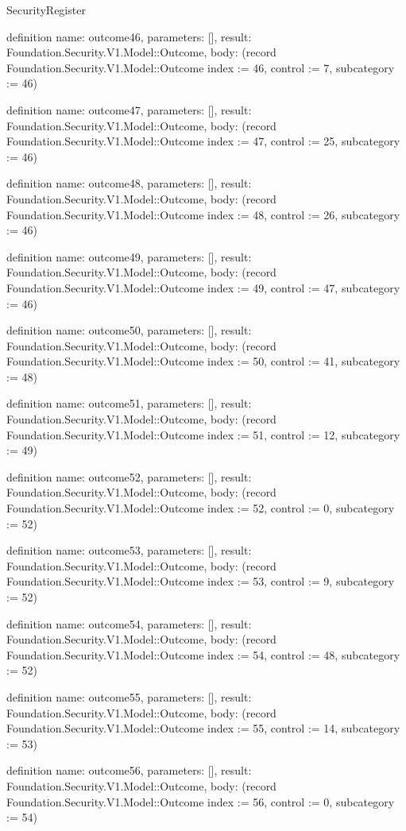 \begin{lexlean}{SecurityRegister}
\begin{semanticmodule}
definition{
  name: outcome46,
  parameters: [],
  result: Foundation.Security.V1.Model::Outcome,
  body: (record Foundation.Security.V1.Model::Outcome {index := 46, control := 7, subcategory := 46})
}

definition{
  name: outcome47,
  parameters: [],
  result: Foundation.Security.V1.Model::Outcome,
  body: (record Foundation.Security.V1.Model::Outcome {index := 47, control := 25, subcategory := 46})
}

definition{
  name: outcome48,
  parameters: [],
  result: Foundation.Security.V1.Model::Outcome,
  body: (record Foundation.Security.V1.Model::Outcome {index := 48, control := 26, subcategory := 46})
}

definition{
  name: outcome49,
  parameters: [],
  result: Foundation.Security.V1.Model::Outcome,
  body: (record Foundation.Security.V1.Model::Outcome {index := 49, control := 47, subcategory := 46})
}

definition{
  name: outcome50,
  parameters: [],
  result: Foundation.Security.V1.Model::Outcome,
  body: (record Foundation.Security.V1.Model::Outcome {index := 50, control := 41, subcategory := 48})
}

definition{
  name: outcome51,
  parameters: [],
  result: Foundation.Security.V1.Model::Outcome,
  body: (record Foundation.Security.V1.Model::Outcome {index := 51, control := 12, subcategory := 49})
}

definition{
  name: outcome52,
  parameters: [],
  result: Foundation.Security.V1.Model::Outcome,
  body: (record Foundation.Security.V1.Model::Outcome {index := 52, control := 0, subcategory := 52})
}

definition{
  name: outcome53,
  parameters: [],
  result: Foundation.Security.V1.Model::Outcome,
  body: (record Foundation.Security.V1.Model::Outcome {index := 53, control := 9, subcategory := 52})
}

definition{
  name: outcome54,
  parameters: [],
  result: Foundation.Security.V1.Model::Outcome,
  body: (record Foundation.Security.V1.Model::Outcome {index := 54, control := 48, subcategory := 52})
}

definition{
  name: outcome55,
  parameters: [],
  result: Foundation.Security.V1.Model::Outcome,
  body: (record Foundation.Security.V1.Model::Outcome {index := 55, control := 14, subcategory := 53})
}

definition{
  name: outcome56,
  parameters: [],
  result: Foundation.Security.V1.Model::Outcome,
  body: (record Foundation.Security.V1.Model::Outcome {index := 56, control := 0, subcategory := 54})
}


\end{semanticmodule}
\end{lexlean}
